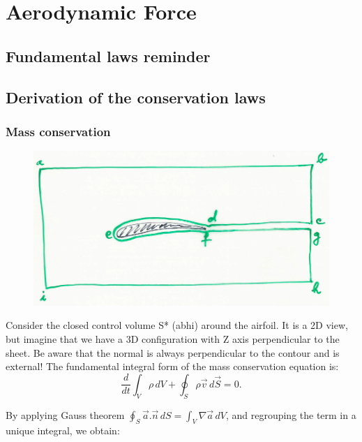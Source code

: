 
\chapter{Aerodynamic Force}
\section{Fundamental laws reminder}
	
\section{Derivation of the conservation laws}
	\subsection{Mass conservation}
		
		\begin{figure}
		\vspace{-5mm}
		\includegraphics[scale=0.3]{ch1/1}
		\end{figure}
		Consider the closed control volume S* (abhi) around the airfoil. It is a 2D view, but imagine that we have a 3D configuration with Z axis perpendicular to the sheet. Be aware that the normal is always perpendicular to the contour and is external! The fundamental integral form of the mass conservation equation is:\\
		
		\begin{equation}
		\frac{d}{dt}\int _V \rho \, dV + \oint _S \rho \vec{v} \, d\vec{S} = 0.
		\end{equation}

		By applying Gauss theorem $\oint _S \vec{a}.\vec{n}\, dS = \int _V \nabla\vec{a}\, dV$, and regrouping the term in a unique integral, we obtain:
		
